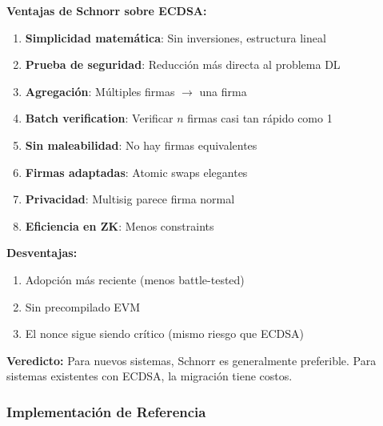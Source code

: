 \documentclass[11pt,a4paper,twoside,openright]{book}
\theoremstyle{definition}
\theoremstyle{plain}
\theoremstyle{remark}
\begin{document}
\begin{keyidea}
\textbf{Ventajas de Schnorr sobre ECDSA:}

\begin{enumerate}
    \item \textbf{Simplicidad matemática}: Sin inversiones, estructura lineal
    \item \textbf{Prueba de seguridad}: Reducción más directa al problema DL
    \item \textbf{Agregación}: Múltiples firmas $\to$ una firma
    \item \textbf{Batch verification}: Verificar $n$ firmas casi tan rápido como 1
    \item \textbf{Sin maleabilidad}: No hay firmas equivalentes
    \item \textbf{Firmas adaptadas}: Atomic swaps elegantes
    \item \textbf{Privacidad}: Multisig parece firma normal
    \item \textbf{Eficiencia en ZK}: Menos constraints
\end{enumerate}

\textbf{Desventajas:}
\begin{enumerate}
    \item Adopción más reciente (menos battle-tested)
    \item Sin precompilado EVM
    \item El nonce sigue siendo crítico (mismo riesgo que ECDSA)
\end{enumerate}

\textbf{Veredicto:} Para nuevos sistemas, Schnorr es generalmente preferible. Para sistemas existentes con ECDSA, la migración tiene costos.
\end{keyidea}

\subsubsection{Implementación de Referencia}
\end{document}
